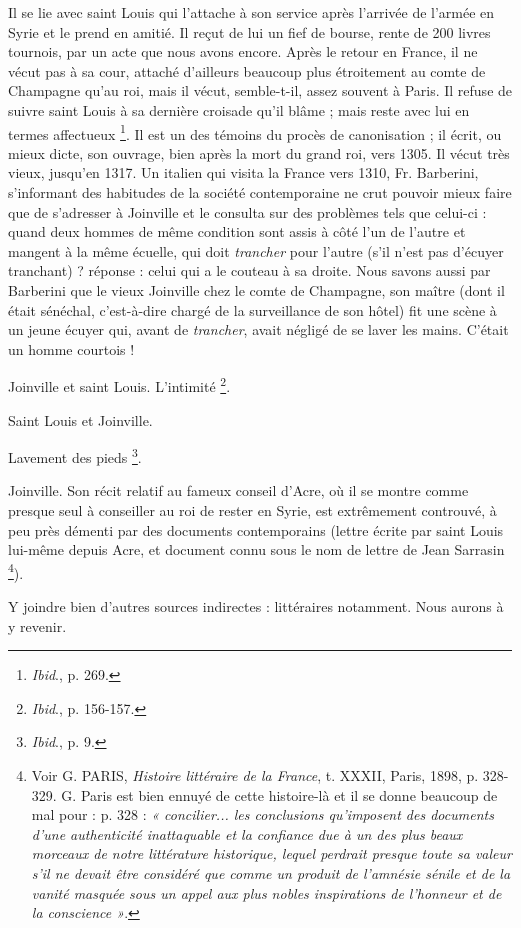\documentclass[french,twoside]{book} %
\begin{document}
Il se lie avec saint Louis qui l’attache à son service après l’arrivée de l’armée en Syrie et le prend en amitié. Il reçut de lui un fief de bourse, rente de 200 livres tournois, par un acte que nous avons encore. Après le retour en France, il ne vécut pas à sa cour, attaché d’ailleurs beaucoup plus étroitement au comte de Champagne qu’au roi, mais il vécut, semble-t-il, assez souvent à Paris. Il refuse de suivre saint Louis à sa dernière croisade qu’il blâme ; mais reste avec lui en termes affectueux \footnote{{\itshape Ibid}., p. 269.}. Il est un des témoins du procès de canonisation ; il écrit, ou mieux dicte, son ouvrage, bien après la mort du grand roi, vers 1305. Il vécut très vieux, jusqu’en 1317. Un italien qui visita la France vers 1310, Fr. Barberini, s’informant des habitudes de la société contemporaine ne crut pouvoir mieux faire que de s’adresser à Joinville et le consulta sur des problèmes tels que celui-ci : quand deux hommes de même condition sont assis à côté l’un de l’autre et mangent à la même écuelle, qui doit {\itshape trancher} pour l’autre (s’il n’est pas d’écuyer tranchant) ? réponse : celui qui a le couteau à sa droite. Nous savons aussi par Barberini que le vieux Joinville chez le comte de Champagne, son maître (dont il était sénéchal, c’est-à-dire chargé de la surveillance de son hôtel) fit une scène à un jeune écuyer qui, avant de \emph{trancher}, avait négligé de se laver les mains. C’était un homme courtois ! \par
Joinville et saint Louis. L’intimité \footnote{{\itshape Ibid}., p. 156-157. }.\par
Saint Louis et Joinville.\par
Lavement des pieds \footnote{{\itshape Ibid}., p. 9.}.\par
Joinville. Son récit relatif au fameux conseil d’Acre, où il se montre comme presque seul à conseiller au roi de rester en Syrie, est extrêmement controuvé, à peu près démenti par des documents contemporains (lettre écrite par saint Louis lui-même depuis Acre, et document connu sous le nom de lettre de Jean Sarrasin \footnote{ Voir G. PARIS, {\itshape Histoire littéraire de la France}, t. XXXII, Paris, 1898, p. 328-329. G. Paris est bien ennuyé de cette histoire-là et il se donne beaucoup de mal pour : p. 328 : \emph{« concilier... les conclusions qu’imposent des documents d’une authenticité inattaquable et la confiance due à un des plus beaux morceaux de notre littérature historique, lequel perdrait presque toute sa valeur s’il ne devait être considéré que comme un produit de l’amnésie sénile et de la vanité masquée sous un appel aux plus nobles inspirations de l’honneur et de la conscience »}.}).\par
Y joindre bien d’autres sources indirectes : littéraires notamment. Nous aurons à y revenir.
\end{document}
